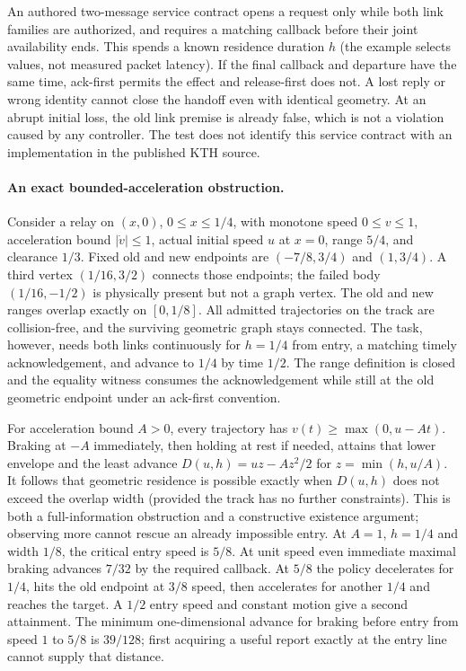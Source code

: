 \documentclass{article}
\begin{document}
An authored two-message service contract opens a request only
while both link families are authorized, and requires a matching
callback before their joint availability ends. This spends a
known residence duration $h$ (the example selects values, not
measured packet latency). If the final callback and departure
have the same time, ack-first permits the effect and release-first
does not. A lost reply or wrong identity cannot close the
handoff even with identical geometry. At an abrupt initial loss,
the old link premise is already false, which is not a violation
caused by any controller. The test does not identify this service
contract with an implementation in the published KTH source.

\paragraph{An exact bounded-acceleration obstruction.}
Consider a relay on $(x,0)$, $0\leq x\leq1/4$, with
monotone speed $0\leq v\leq1$, acceleration bound $|\dot v|\leq1$,
actual initial speed $u$ at $x=0$, range $5/4$, and clearance $1/3$.
Fixed old and new endpoints are $(-7/8,3/4)$ and $(1,3/4)$.
A third vertex $(1/16,3/2)$ connects those endpoints; the failed
body $(1/16,-1/2)$ is physically present but not a graph vertex.
The old and new ranges overlap exactly on $[0,1/8]$.
All admitted trajectories on the track are collision-free,
and the surviving geometric graph stays connected. The task,
however, needs both links continuously for $h=1/4$ from entry,
a matching timely acknowledgement, and advance to $1/4$ by time
$1/2$. The range definition is closed and the equality witness
consumes the acknowledgement while still at the old geometric
endpoint under an ack-first convention.

For acceleration bound $A>0$, every trajectory has
$v(t)\geq\max(0,u-At)$. Braking at $-A$ immediately, then holding
at rest if needed, attains that lower envelope and the least
advance $D(u,h)=u z-Az^2/2$ for $z=\min(h,u/A)$. It follows that
geometric residence is possible exactly when $D(u,h)$ does not
exceed the overlap width (provided the track has no further
constraints). This is both a full-information obstruction and a
constructive existence argument; observing more cannot rescue
an already impossible entry. At $A=1$, $h=1/4$ and width $1/8$,
the critical entry speed is $5/8$. At unit speed even immediate
maximal braking advances $7/32$ by the required callback. At
$5/8$ the policy decelerates for $1/4$, hits the old endpoint
at $3/8$ speed, then accelerates for another $1/4$ and reaches
the target. A $1/2$ entry speed and constant motion give a second
attainment. The minimum one-dimensional advance for braking
before entry from speed $1$ to $5/8$ is $39/128$; first acquiring
a useful report exactly at the entry line cannot supply that
distance.
\end{document}
